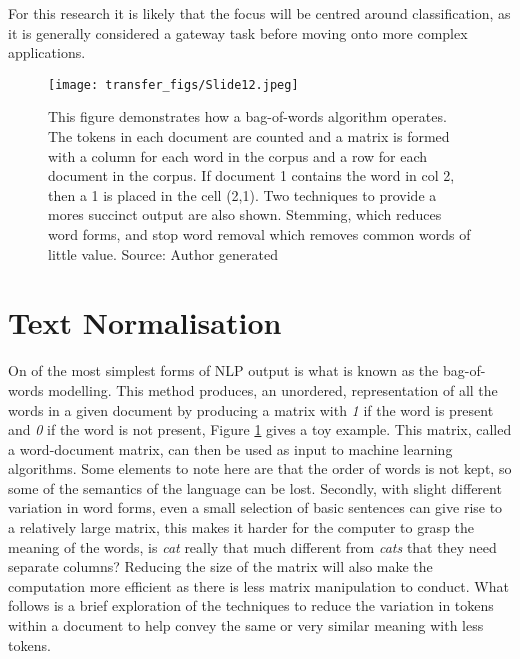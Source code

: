 For this research it is likely that the focus will be centred around classification, as it is generally considered a gateway task before moving onto more complex applications.


\begin{figure}
  \texttt{[image: transfer\_figs/Slide12.jpeg]}
  \caption[Bag-of-Words Example.]{This figure demonstrates how a bag-of-words algorithm operates. The tokens in each document are counted and a matrix is formed with a column for each word in the corpus and a row for each document in the corpus. If document 1 contains the word in col 2, then a 1 is placed in the cell (2,1). Two techniques to provide a mores succinct output are also shown. Stemming, which reduces word forms, and stop word removal which removes common words of little value. Source: Author generated}
  \label{fig:BOW}
\end{figure}

\section{Text Normalisation} On of the most simplest forms of NLP output is what is known as the bag-of-words modelling. This method produces, an unordered, representation of all the words in a given document by producing a matrix with \emph{1} if the word is present and \emph{0} if the word is not present, Figure \ref{fig:BOW} gives a toy example. This matrix, called a word-document matrix, can then be used as input to machine learning algorithms. Some elements to note here are that the order of words is not kept, so some of the semantics of the language can be lost. Secondly, with slight different variation in word forms, even a small selection of basic sentences can give rise to a relatively large matrix, this makes it harder for the computer to grasp the meaning of the words, is \emph{cat} really that much different from \emph{cats} that they need separate columns? Reducing the size of the matrix will also make the computation more efficient as there is less matrix manipulation to conduct. What follows is a brief exploration of the techniques to reduce the variation in tokens within a document to help convey the same or very similar meaning with less tokens.

